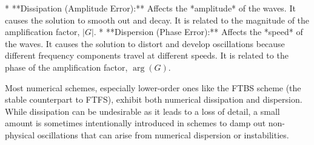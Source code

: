 \documentclass[12pt,a4paper]{report}
\begin{document}
\begin{itemize}
*   **Dissipation (Amplitude Error):** Affects the *amplitude* of the waves. It causes the solution to smooth out and decay. It is related to the magnitude of the amplification factor, \(|G|\).
*   **Dispersion (Phase Error):** Affects the *speed* of the waves. It causes the solution to distort and develop oscillations because different frequency components travel at different speeds. It is related to the phase of the amplification factor, \(\arg(G)\).

Most numerical schemes, especially lower-order ones like the FTBS scheme (the stable counterpart to FTFS), exhibit both numerical dissipation and dispersion. While dissipation can be undesirable as it leads to a loss of detail, a small amount is sometimes intentionally introduced in schemes to damp out non-physical oscillations that can arise from numerical dispersion or instabilities.
\end{itemize}
\end{document}
